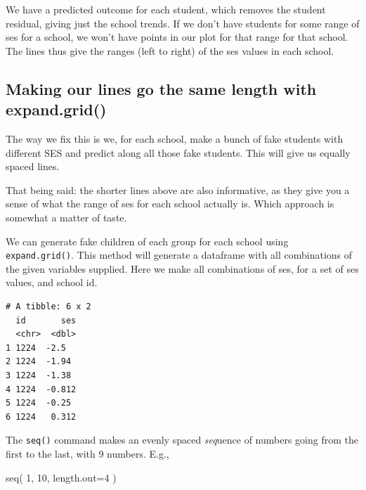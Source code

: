 \documentclass[
  letterpaper,
  DIV=11,
  numbers=noendperiod]{scrreprt}
\newenvironment{Shaded}{}{}
\newcommand{\AttributeTok}[1]{\textcolor[rgb]{0.49,0.56,0.16}{#1}}
\newcommand{\DecValTok}[1]{\textcolor[rgb]{0.25,0.63,0.44}{#1}}
\newcommand{\FloatTok}[1]{\textcolor[rgb]{0.25,0.63,0.44}{#1}}
\newcommand{\FunctionTok}[1]{\textcolor[rgb]{0.02,0.16,0.49}{#1}}
\newcommand{\NormalTok}[1]{#1}
\newcommand{\OtherTok}[1]{\textcolor[rgb]{0.00,0.44,0.13}{#1}}
\newcommand{\SpecialCharTok}[1]{\textcolor[rgb]{0.25,0.44,0.63}{#1}}
\begin{document}
We have a predicted outcome for each student, which removes the student
residual, giving just the school trends. If we don't have students for
some range of ses for a school, we won't have points in our plot for
that range for that school. The lines thus give the ranges (left to
right) of the ses values in each school.

\subsection{Making our lines go the same length with
expand.grid()}\label{making-our-lines-go-the-same-length-with-expand.grid}

The way we fix this is we, for each school, make a bunch of fake
students with different SES and predict along all those fake students.
This will give us equally spaced lines.

That being said: the shorter lines above are also informative, as they
give you a sense of what the range of ses for each school actually is.
Which approach is somewhat a matter of taste.

We can generate fake children of each group for each school using
\texttt{expand.grid()}. This method will generate a dataframe with all
combinations of the given variables supplied. Here we make all
combinations of ses, for a set of ses values, and school id.

\begin{Shaded}
\end{Shaded}

\begin{verbatim}
# A tibble: 6 x 2
  id       ses
  <chr>  <dbl>
1 1224  -2.5  
2 1224  -1.94 
3 1224  -1.38 
4 1224  -0.812
5 1224  -0.25 
6 1224   0.312
\end{verbatim}

The \texttt{seq()} command makes an evenly spaced \emph{seq}uence of
numbers going from the first to the last, with 9 numbers. E.g.,

\begin{Shaded}
\begin{Highlighting}[]
\FunctionTok{seq}\NormalTok{( }\DecValTok{1}\NormalTok{, }\DecValTok{10}\NormalTok{, }\AttributeTok{length.out=}\DecValTok{4}\NormalTok{ )}
\end{Highlighting}
\end{Shaded}
\end{document}

